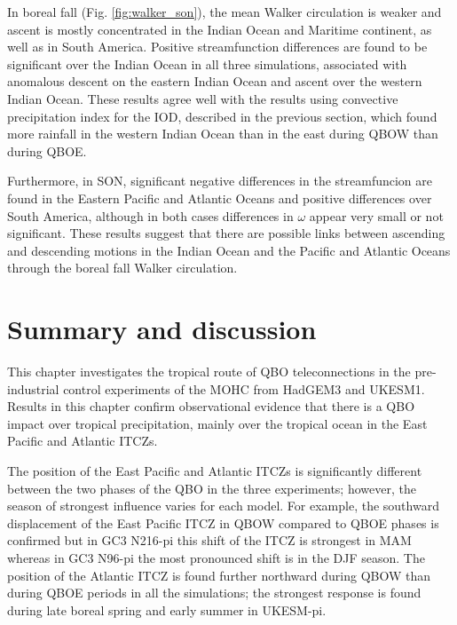 In boreal fall (Fig. \ref{fig:walker_son}), the mean Walker circulation is weaker and ascent is mostly concentrated in the Indian Ocean and Maritime continent, as well as in South America. 
Positive streamfunction differences are found to be significant over the Indian Ocean in all three simulations, associated with anomalous descent on the eastern Indian Ocean and ascent over the western Indian Ocean. These results agree well with the results using convective precipitation index for the IOD, described in the previous section, which found more rainfall in the western Indian Ocean than in the east during QBOW than during QBOE. 

Furthermore, in SON, significant negative differences in the streamfuncion are found in the Eastern Pacific and Atlantic Oceans and positive differences over South America, although in both cases differences in $\omega$ appear very small or not significant. 
These results suggest that there are possible links between ascending and descending motions in the Indian Ocean and the Pacific and Atlantic Oceans through the boreal fall Walker circulation.


\section{Summary and discussion}

This chapter investigates the tropical route of QBO teleconnections in the pre-industrial control experiments of the MOHC from HadGEM3 and UKESM1.
Results in this chapter confirm observational evidence \citep{collimore2003,liess2012,gray2018}  that there is a QBO impact over tropical precipitation, mainly over the tropical ocean in the East Pacific and Atlantic ITCZs.


The position of the East Pacific and Atlantic ITCZs is significantly different between the two phases of the QBO in the three experiments; however, the season of strongest influence varies for each model. 
For example, the southward displacement of the East Pacific ITCZ in QBOW compared to QBOE phases  \citep[as previously reported, e.g., by][]{gray2018} is confirmed but in GC3 N216-pi this shift of the ITCZ is strongest in MAM whereas in GC3 N96-pi the most pronounced shift is in the DJF season. 
The position of the Atlantic ITCZ is found further  northward during QBOW than during QBOE periods in all the simulations; the strongest response is found during late boreal spring and early summer in UKESM-pi. 

